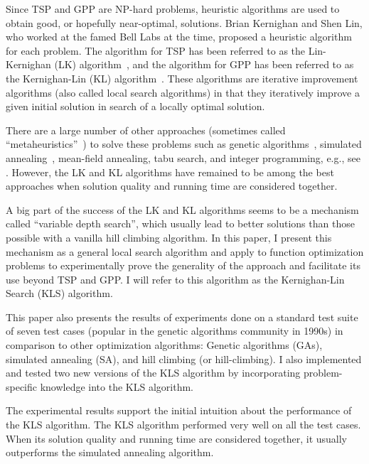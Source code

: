 \documentclass{article}
\begin{document}
Since TSP and GPP are NP-hard problems, heuristic algorithms are used
to obtain good, or hopefully near-optimal, solutions. Brian Kernighan
and Shen Lin, who worked at the famed Bell Labs at the time, proposed
a heuristic algorithm for each problem. The algorithm for TSP has been
referred to as the Lin-Kernighan (LK) algorithm~\cite{LiKe73}, and the
algorithm for GPP has been referred to as the Kernighan-Lin (KL)
algorithm~\cite{KeLi70}. These algorithms are iterative improvement
algorithms (also called local search algorithms) in that they
iteratively improve a given initial solution in search of a locally
optimal solution.

There are a large number of other approaches (sometimes called
``metaheuristics''~\cite{Wi20}) to solve these problems such as
genetic algorithms~\cite{Go89}, simulated
annealing~\cite{JoArMc89,JoArMc91}, mean-field annealing, tabu search,
and integer programming, e.g., see
\cite{LoMaSt02,PiRo10,SoSeGl18,Wi20}. However, the LK and KL
algorithms have remained to be among the best approaches when solution
quality and running time are considered together.

A big part of the success of the LK and KL algorithms seems to be a
mechanism called ``variable depth search'', which usually lead to
better solutions than those possible with a vanilla hill climbing
algorithm. In this paper, I present this mechanism as a general local
search algorithm and apply to function optimization problems to
experimentally prove the generality of the approach and facilitate its
use beyond TSP and GPP. I will refer to this algorithm as the
Kernighan-Lin Search (KLS) algorithm.

This paper also presents the results of experiments done on a standard
test suite of seven test cases (popular in the genetic algorithms
community in 1990s) in comparison to other optimization algorithms:
Genetic algorithms (GAs), simulated annealing (SA), and hill climbing
(or hill-climbing). I also implemented and tested two new versions of
the KLS algorithm by incorporating problem-specific knowledge into the
KLS algorithm.

The experimental results support the initial intuition about the
performance of the KLS algorithm. The KLS algorithm performed very
well on all the test cases. When its solution quality and running time
are considered together, it usually outperforms the simulated
annealing algorithm.
\end{document}
